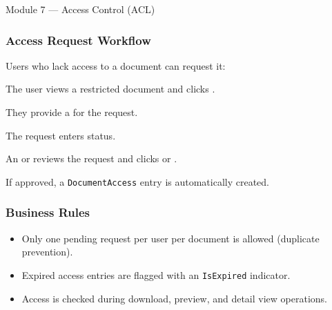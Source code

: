 \begin{ugModule}{Module 7 --- Access Control (ACL)}
  \subsubsection*{Access Request Workflow}
  Users who lack access to a document can request it:
  \begin{ugSteps}
    \item The  user views a restricted document
          and clicks .
    \item They provide a  for the request.
    \item The request enters
           status.
    \item An  or  reviews the
          request and clicks  or
          .
    \item If approved, a \texttt{DocumentAccess} entry is
          automatically created.
  \end{ugSteps}

  \subsubsection*{Business Rules}
  \begin{itemize}[leftmargin=18pt]
    \item Only one pending request per user per document is
          allowed (duplicate prevention).
    \item Expired access entries are flagged with an
          \texttt{IsExpired} indicator.
    \item Access is checked during download, preview, and
          detail view operations.
  \end{itemize}
\end{ugModule}

\vspace{10pt}

